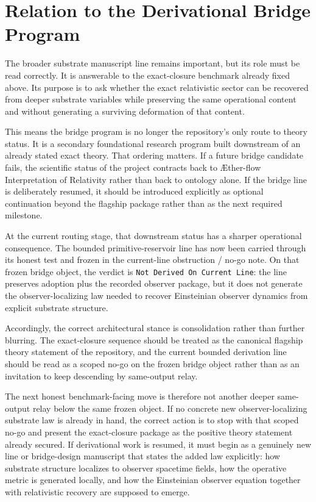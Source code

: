 \documentclass[11pt]{article}
\newcommand{\Aflow}{\AE{}ther-flow}
\newcommand{\TheoryName}{\Aflow{} Interpretation of Relativity}
\begin{document}
\section{Relation to the Derivational Bridge Program}

The broader substrate manuscript line remains important, but its role must be read correctly. It is answerable to the exact-closure benchmark already fixed above. Its purpose is to ask whether the exact relativistic sector can be recovered from deeper substrate variables while preserving the same operational content and without generating a surviving deformation of that content.

This means the bridge program is no longer the repository's only route to theory status. It is a secondary foundational research program built downstream of an already stated exact theory. That ordering matters. If a future bridge candidate fails, the scientific status of the project contracts back to \TheoryName{} rather than back to ontology alone. If the bridge line is deliberately resumed, it should be introduced explicitly as optional continuation beyond the flagship package rather than as the next required milestone.

At the current routing stage, that downstream status has a sharper operational consequence. The bounded primitive-reservoir line has now been carried through its honest test and frozen in the current-line obstruction / no-go note. On that frozen bridge object, the verdict is \texttt{Not Derived On Current Line}: the line preserves adoption plus the recorded observer package, but it does not generate the observer-localizing law needed to recover Einsteinian observer dynamics from explicit substrate structure.

Accordingly, the correct architectural stance is consolidation rather than further blurring. The exact-closure sequence should be treated as the canonical flagship theory statement of the repository, and the current bounded derivation line should be read as a scoped no-go on the frozen bridge object rather than as an invitation to keep descending by same-output relay.

The next honest benchmark-facing move is therefore not another deeper same-output relay below the same frozen object. If no concrete new observer-localizing substrate law is already in hand, the correct action is to stop with that scoped no-go and present the exact-closure package as the positive theory statement already secured. If derivational work is resumed, it must begin as a genuinely new line or bridge-design manuscript that states the added law explicitly: how substrate structure localizes to observer spacetime fields, how the operative metric is generated locally, and how the Einsteinian observer equation together with relativistic recovery are supposed to emerge.
\end{document}
